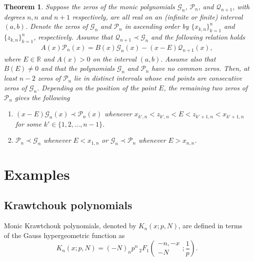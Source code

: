 \documentclass[final,3p,times,12pt]{elsarticle}
\newtheorem{theorem}{Theorem}[section]
\numberwithin{equation}{section}  %
\begin{document}
\begin{theorem}\label{MainTheorem2}
	Suppose the zeros of the monic polynomials $\mathcal{G}_{n}$, $\mathcal{P}_n$, and $\mathcal{Q}_{n+1}$, with degrees $n,n$ and $n+1$ respectively, are all real on an (infinite or finite) interval $(a,b)$. Denote the zeros of $\mathcal{G}_{n}$ and $\mathcal{P}_n$ in ascending order by 
	$\{x_{k,n}\}_{k=1}^{n}$ and $\{z_{k,n}\}_{k=1}^{n}$, respectively.  Assume that $\mathcal{Q}_{n+1}\prec \mathcal{G}_{n}$ and the following relation holds
	\begin{align}\label{GeneralMixedTTRR2}
		A(x)\mathcal{P}_{n}(x) = B(x)\mathcal{G}_{n}(x) - (x-E)\mathcal{Q}_{n+1}(x),
	\end{align}
	where $E \in \mathbb{R}$ and $A(x) > 0$ on the interval $(a,b)$. 
	Assume also that $B(E) \neq 0$ and that the polynomials $\mathcal{G}_{n}$ and $\mathcal{P}_{n}$ have no common zeros. 
	Then, at least $n-2$ zeros of $\mathcal{P}_n$ lie in distinct intervals whose end points are consecutive zeros of $\mathcal{G}_n$.  
	Depending on the position of the point $E$, the remaining two zeros of $\mathcal{P}_n$ gives the following
	\begin{enumerate}
		\item $(x-E)\mathcal{G}_n(x) \prec \mathcal{P}_n(x)$ whenever $
		x_{k',n} < z_{k',n} < E < z_{k'+1,n} < x_{k'+1,n}
		$
		for some $k' \in \{1, 2, \ldots, n-1\}$.
		
		\item $\mathcal{P}_n\prec\mathcal{G}_n$ whenever $
		E < x_{1,n}$ or $\mathcal{G}_n\prec\mathcal{P}_n$ whenever $
		E > x_{n,n}$.
	\end{enumerate}
\end{theorem}

\section{Examples}\label{Examples}




\subsection{Krawtchouk polynomials}\label{Examples Krawtchouk}
Monic Krawtchouk polynomials, denoted by $K_n(x; p, N)$, are defined in terms of the Gauss hypergeometric function as
\begin{equation}\label{Monic-Krawtchouk-2F1}
	K_n(x; p, N) = (-N)_n p^n \, {_2F_1}\left(\begin{matrix} -n, -x \\ -N \end{matrix}; \frac{1}{p}\right).
\end{equation}
\end{document}
